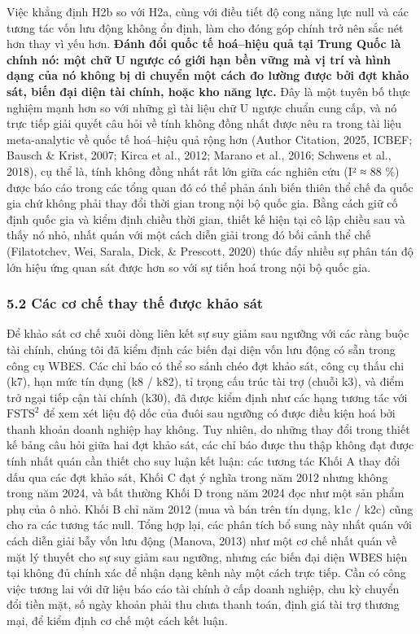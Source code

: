 \documentclass[12pt,a4paper]{article}
\begin{document}
Việc khẳng định H2b so với H2a, cùng với điều tiết độ cong năng lực null
và các tương tác vốn lưu động không ổn định, làm cho đóng góp chính trở
nên sắc nét hơn thay vì yếu hơn. \textbf{Đánh đổi quốc tế hoá--hiệu quả
tại Trung Quốc là chính nó: một chữ U ngược có giới hạn bền vững mà vị
trí và hình dạng của nó không bị di chuyển một cách đo lường được bởi
đợt khảo sát, biến đại diện tài chính, hoặc kho năng lực.} Đây là một
tuyên bố thực nghiệm mạnh hơn so với những gì tài liệu chữ U ngược chuẩn
cung cấp, và nó trực tiếp giải quyết câu hỏi về tính không đồng nhất
được nêu ra trong tài liệu meta-analytic về quốc tế hoá--hiệu quả rộng
hơn (Author Citation, 2025, ICBEF; Bausch \& Krist, 2007; Kirca et al.,
2012; Marano et al., 2016; Schwens et al., 2018), cụ thể là, tính không
đồng nhất rất lớn giữa các nghiên cứu (I² ≈ 88 \%) được báo cáo trong
các tổng quan đó có thể phản ánh biến thiên thể chế đa quốc gia chứ
không phải thay đổi thời gian trong nội bộ quốc gia. Bằng cách giữ cố
định quốc gia và kiểm định chiều thời gian, thiết kế hiện tại cô lập
chiều sau và thấy nó nhỏ, nhất quán với một cách diễn giải trong đó bối
cảnh thể chế (Filatotchev, Wei, Sarala, Dick, \& Prescott, 2020) thúc
đẩy nhiều sự phân tán độ lớn hiệu ứng quan sát được hơn so với sự tiến
hoá trong nội bộ quốc gia.

\hypertarget{52-cuxe1c-cux1a1-chux1ebf-thay-thux1ebf-ux111ux1b0ux1ee3c-khux1ea3o-suxe1t}{%
\subsubsection{5.2 Các cơ chế thay thế được khảo
sát}\label{52-cuxe1c-cux1a1-chux1ebf-thay-thux1ebf-ux111ux1b0ux1ee3c-khux1ea3o-suxe1t}}

Để khảo sát cơ chế xuôi dòng liên kết sự suy giảm sau ngưỡng với các
ràng buộc tài chính, chúng tôi đã kiểm định các biến đại diện vốn lưu
động có sẵn trong công cụ WBES. Các chỉ báo có thể so sánh chéo đợt khảo
sát, công cụ thấu chi (k7), hạn mức tín dụng (k8 / k82), tỉ trọng cấu
trúc tài trợ (chuỗi k3), và điểm trở ngại tiếp cận tài chính (k30), đã
được kiểm định như các hạng tương tác với \(\mathrm{FSTS}^2\) để xem xét
liệu độ dốc của đuôi sau ngưỡng có được điều kiện hoá bởi thanh khoản
doanh nghiệp hay không. Tuy nhiên, do những thay đổi trong thiết kế bảng
câu hỏi giữa hai đợt khảo sát, các chỉ báo được thu thập không đạt được
tính nhất quán cần thiết cho suy luận kết luận: các tương tác Khối A
thay đổi dấu qua các đợt khảo sát, Khối C đạt ý nghĩa trong năm 2012
nhưng không trong năm 2024, và bất thường Khối D trong năm 2024 đọc như
một sản phẩm phụ của ô nhỏ. Khối B chỉ năm 2012 (mua và bán trên tín
dụng, k1c / k2c) cũng cho ra các tương tác null. Tổng hợp lại, các phân
tích bổ sung này nhất quán với cách diễn giải bẫy vốn lưu động (Manova,
2013) như một cơ chế nhất quán về mặt lý thuyết cho sự suy giảm sau
ngưỡng, nhưng các biến đại diện WBES hiện tại không đủ chính xác để nhận
dạng kênh này một cách trực tiếp. Cần có công việc tương lai với dữ liệu
báo cáo tài chính ở cấp doanh nghiệp, chu kỳ chuyển đổi tiền mặt, số
ngày khoản phải thu chưa thanh toán, định giá tài trợ thương mại, để
kiểm định cơ chế một cách kết luận.
\end{document}
